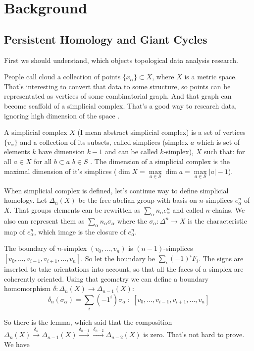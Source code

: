 \documentclass[a4paper, 12pt]{article}
\begin{document}
\section{Background}
\subsection{Persistent Homology and Giant Cycles}
\par First we should understand, which objects topological data analysis research.
\par People call cloud a collection of points $\{x_\alpha\} \subset X$, where $X$ is a metric space. That's interesting to convert that data to some structure, so points can be representated as vertices of some combinatorial graph. And that graph can become scaffold of a simplicial complex. That's a good way to research data, ignoring high dimension of the space \cite{ghrist}.
\par A simplicial complex $X$ (I mean abstract simplicial complex) is a set of vertices $\{v_\alpha\}$ and a collection of its subsets, called simplices (simplex $a$ which is set of elements $k$ have dimension $k-1$ and can be called $k$-simplex), $X$ such that: for all $a\in X$ for all $b\subset a$ $b\in S$ \cite{prasolov}. The dimension of a simplicial complex is the maximal dimension of it's simplices ($\dim X = \max\limits_{a\in S} \dim a =\max\limits_{a\in S}|a| - 1$).
\par When simplicial complex is defined, let's continue way to define simplicial homology. Let $\Delta_n(X)$ be the free abelian group with basis on $n$-simplices $e_\alpha^n$ of $X$.  That groups elements can be rewritten as $\sum_\alpha n_\alpha e_\alpha^n$ and called $n$-chains. We also can represent them as $\sum_\alpha n_\alpha \sigma_\alpha$ where the $\sigma_\alpha: \Delta^n\to X$ is the characteristic map of $e_\alpha^n$, which image is the closure of $e_\alpha^n$. 
\par The boundary of $n$-simplex $(v_0, ..., v_n)$ is $(n-1)$-simplices $[v_0, ..., v_{i-1}, v_{i+1}, ..., v_n]$. So let the boundary be $\sum_i (-1)^i F_i$. The signs are inserted to take orientations into account, so that all the faces of a simplex are coherently oriented. Using that geometry we can define a boundary homomorphism $\delta: \Delta_n(X) \to \Delta_{n-1}(X)$:
$$
	\delta_n(\sigma_\alpha) = \sum_i (-1^i)\sigma_\alpha \;:\;
	[v_0, ..., v_{i-1}, v_{i+1}, ..., v_n]
$$
\par So there is the lemma, which said that the composition $\Delta_n(X) \xrightarrow{\delta_n} \Delta_{n-1}(X) \xrightarrow{\delta_{n-1}} \xrightarrow{\delta_{n-2}} \Delta_{n-2}(X)$ is zero. That's not hard to prove. We have 
\end{document}
